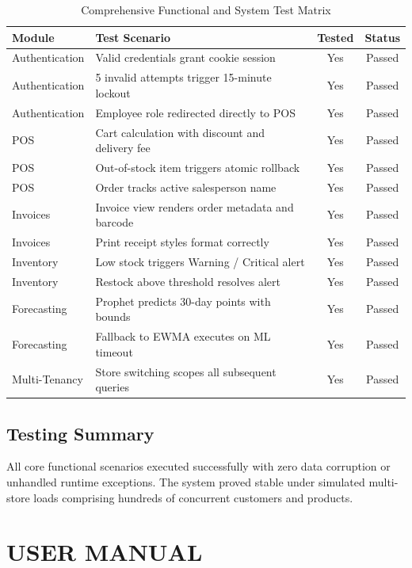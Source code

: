 \documentclass[12pt,a4paper]{report}
\begin{document}
\begin{table}[H]
\centering
\begin{tabular}{|l|p{6.5cm}|c|c|}
\hline
\textbf{Module} & \textbf{Test Scenario} & \textbf{Tested} & \textbf{Status} \\
\hline
Authentication & Valid credentials grant cookie session & Yes & Passed \\
Authentication & 5 invalid attempts trigger 15-minute lockout & Yes & Passed \\
Authentication & Employee role redirected directly to POS & Yes & Passed \\
\hline
POS & Cart calculation with discount and delivery fee & Yes & Passed \\
POS & Out-of-stock item triggers atomic rollback & Yes & Passed \\
POS & Order tracks active salesperson name & Yes & Passed \\
\hline
Invoices & Invoice view renders order metadata and barcode & Yes & Passed \\
Invoices & Print receipt styles format correctly & Yes & Passed \\
\hline
Inventory & Low stock triggers Warning / Critical alert & Yes & Passed \\
Inventory & Restock above threshold resolves alert & Yes & Passed \\
\hline
Forecasting & Prophet predicts 30-day points with bounds & Yes & Passed \\
Forecasting & Fallback to EWMA executes on ML timeout & Yes & Passed \\
\hline
Multi-Tenancy & Store switching scopes all subsequent queries & Yes & Passed \\
\hline
\end{tabular}
\caption{Comprehensive Functional and System Test Matrix}
\end{table}

\section{Testing Summary}
All core functional scenarios executed successfully with zero data corruption or unhandled runtime exceptions. The system proved stable under simulated multi-store loads comprising hundreds of concurrent customers and products.

\chapter{USER MANUAL}
\end{document}

